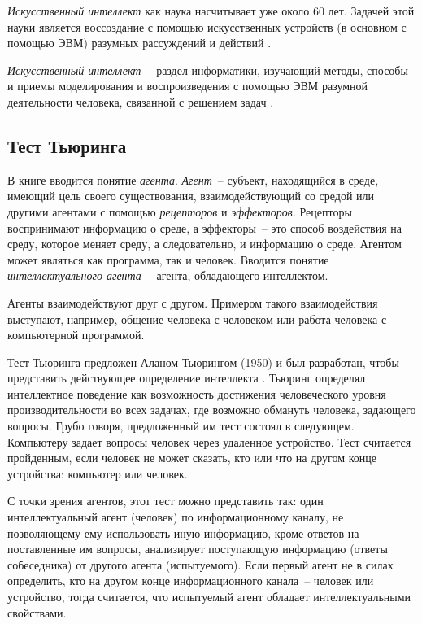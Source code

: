\documentclass[a4paper,14pt, openany, twoside, draft]{extbook} %
\begin{document}
{\em Искусственный интеллект} как наука насчитывает уже около 60 лет. Задачей этой науки является воссоздание с помощью искусственных устройств (в основном с помощью ЭВМ) разумных рассуждений и действий \cite{Lauriere}.

{\em Искусственный интеллект}~-- раздел информатики, изучающий методы, способы и приемы моделирования и воспроизведения с помощью ЭВМ разумной деятельности человека, связанной с решением задач \cite{math_slov:88}.

\subsection{Тест Тьюринга}

В книге \cite{Russell} вводится понятие {\em агента}. {\em Агент}~-- субъект, находящийся в среде, имеющий цель своего существования, взаимодействующий со средой или другими агентами с помощью {\em рецепторов} и {\em эффекторов}. Рецепторы воспринимают информацию о среде, а эффекторы~-- это способ воздействия на среду, которое меняет среду, а следовательно, и информацию о среде. Агентом может являться как программа, так и человек. Вводится понятие {\em интеллектуального агента}~-- агента, обладающего интеллектом.

Агенты взаимодействуют друг с другом. Примером такого взаимодействия выступают, например, общение человека с человеком или работа человека с компьютерной программой.

Тест Тьюринга предложен Аланом Тьюрингом (1950) и был разработан, чтобы представить действующее определение интеллекта \cite{Russell}. Тьюринг определял интеллектное поведение как возможность достижения человеческого уровня производительности во всех задачах, где возможно обмануть человека, задающего вопросы. Грубо говоря, предложенный им тест состоял в следующем. Компьютеру задает вопросы человек через удаленное устройство. Тест считается пройденным, если человек не может сказать, кто или что на другом конце устройства: компьютер или человек.

С точки зрения агентов, этот тест можно представить так: один интеллектуальный агент (человек) по информационному каналу, не позволяющему ему использовать иную информацию, кроме ответов на поставленные им вопросы, анализирует поступающую информацию (ответы собеседника) от другого агента (испытуемого). Если первый агент не в силах определить, кто на другом конце информационного канала~-- человек или устройство, тогда считается, что испытуемый агент обладает интеллектуальными свойствами.
\end{document}
